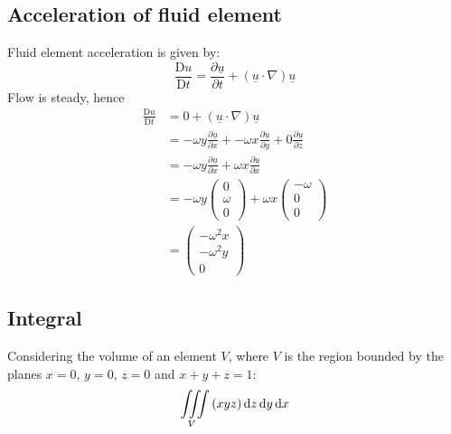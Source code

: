\documentclass[11pt]{article}
\numberwithin{equation}{section}
\begin{document}
\subsection{Acceleration of fluid element}
Fluid element acceleration is given by:
\begin{equation}
    \frac{\textrm{D}u}{\textrm{D}t} = \frac{\partial \underline{u}}{\partial t} + \left(\underline{u}\cdot \nabla\right)\underline{u}
\end{equation}
Flow is steady, hence
\begin{align}
    \frac{\textrm{D}u}{\textrm{D}t} &= 0 + \left(\underline{u}\cdot \nabla\right)\underline{u}\\
    &= -\omega y\frac{\partial \underline{u}}{\partial x} + -\omega x \frac{\partial \underline{u}}{\partial y} + 0 \frac{\partial \underline{u}}{\partial z}\\
    &= -\omega y\frac{\partial \underline{u}}{\partial x} + \omega x \frac{\partial \underline{u}}{\partial x} \\
    &= -\omega y \begin{pmatrix}
        0\\
        \omega\\
        0
    \end{pmatrix} + \omega x \begin{pmatrix}
        -\omega\\
        0\\
        0
    \end{pmatrix}\\
    &= \begin{pmatrix}
        -\omega^2 x\\
        -\omega^2 y\\
        0
    \end{pmatrix}
\end{align}
\subsection{Integral}
Considering the volume of an element $V$, where $V$ is the region bounded by the planes $x=0$, $y=0$, $z=0$ and $x+y+z=1$:
\begin{equation}
    \iiint\displaylimits_V \left(xyz\right)\dif z \dif y \dif x\\
\end{equation}
\end{document}
